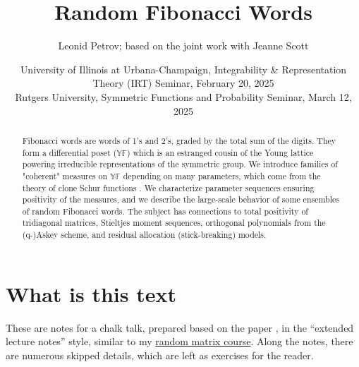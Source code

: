 \documentclass[letterpaper,11pt,oneside,reqno]{article}
\numberwithin{equation}{section}
\theoremstyle{definition}
\begin{document}
\title{Random Fibonacci Words}


\author{Leonid Petrov; based on the joint work with Jeanne Scott \cite{PetrovScott2024Fibonacci}}

\date{University of Illinois at Urbana-Champaign, Integrability \& Representation Theory (IRT) Seminar, February 20, 2025\\
Rutgers University, 
Symmetric Functions and Probability Seminar, March 12, 2025}


\maketitle

\begin{abstract}
	Fibonacci words are words of 1's and 2's, graded by the total sum of the digits. They form a differential poset ($\mathbb{YF}$) which is an estranged cousin of the Young lattice powering irreducible representations of the symmetric group. We introduce families of "coherent" measures on $\mathbb{YF}$ depending on many parameters, which come from the theory of clone Schur functions \cite{okada1994algebras}. We characterize parameter sequences ensuring positivity of the measures, and we describe the large-scale behavior of some ensembles of random Fibonacci words. The subject has connections to total positivity of tridiagonal matrices, Stieltjes moment sequences, orthogonal polynomials from the (q-)Askey scheme, and residual allocation (stick-breaking) models.
\end{abstract}

\section*{What is this text}

These are notes for a chalk talk, prepared based on the paper
\cite{PetrovScott2024Fibonacci}, in the ``extended lecture notes''
style, similar to my \href{https://lpetrov.cc/rmt25/}{random matrix course}.
Along the notes, there are numerous skipped details,
which are left as exercises for the reader.

\setcounter{tocdepth}{1}
\tableofcontents
\setcounter{tocdepth}{3}
\newpage
\end{document}
